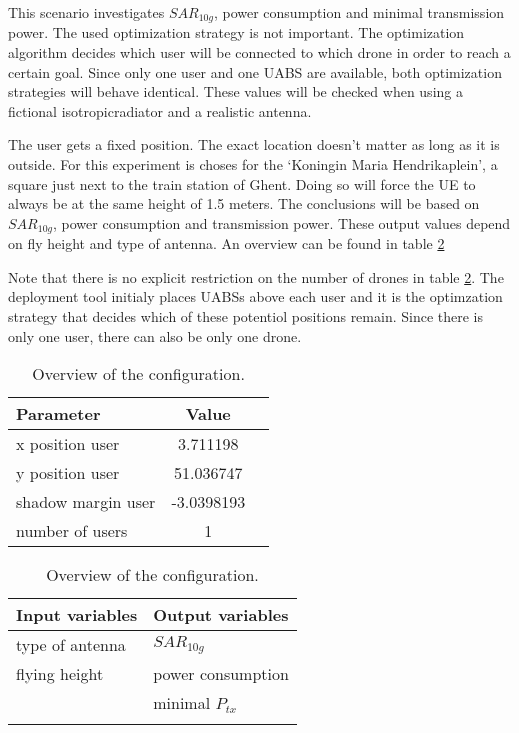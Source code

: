 This scenario investigates $SAR_{10g}$, power consumption and minimal transmission power. The used optimization strategy is not important.
The optimization algorithm decides which user will be connected to which drone in order to reach a certain goal. Since only one user and one
\gls{UABS} are available, both optimization strategies will behave identical. These values will be checked when using a fictional \gls{isotropicradiator} and 
a realistic antenna.

The user gets a fixed position. The exact location doesn't matter as long as it is outside. For this experiment is choses for the 
`Koningin Maria Hendrikaplein', a square just next to the train station of Ghent.  Doing so will force the \gls{UE} 
to always be at the same height of 1.5 meters. The conclusions will be based on $SAR_{10g}$, power consumption and transmission power.
These output values depend on fly height and type of antenna. An overview can be found in table \ref{table:confOverviewScenario1}

Note that there is no explicit restriction on the number of drones in table \ref{table:confOverviewScenario1}. The deployment tool initialy places 
\gls{UABS}s above each user and it is the optimzation strategy that decides which of these potentiol positions remain. Since there is only one user,
there can also be only one drone.

\begin{table}[!htb]
    \begin{minipage}{.5\linewidth}
      \centering
        \begin{tabular}{|l|c|l|}
        \hline
        \textbf{Parameter}              & \textbf{Value}          \\   \hline 
        x position user               & 3.711198       \\    
        y position user               & 51.036747          \\ 
        shadow margin user             & -3.0398193 \\
        number of users                & 1 \\
        \hline
        \end{tabular}
    \end{minipage}%
    \begin{minipage}{.5\linewidth}
      \centering
            \begin{tabular}{|l|l|}
            \hline
            \textbf{Input variables  }              & \textbf{Output variables}          \\   \hline 
            type of antenna                & $SAR_{10g}$               \\ 
            flying height                  & power consumption             \\ 
                                           &  minimal $P_{tx}$ \\ 
                                           & \\
            \hline
            \end{tabular}
    \end{minipage} 
        \caption{Overview of the configuration.}
        \label{table:confOverviewScenario1}
\end{table}


